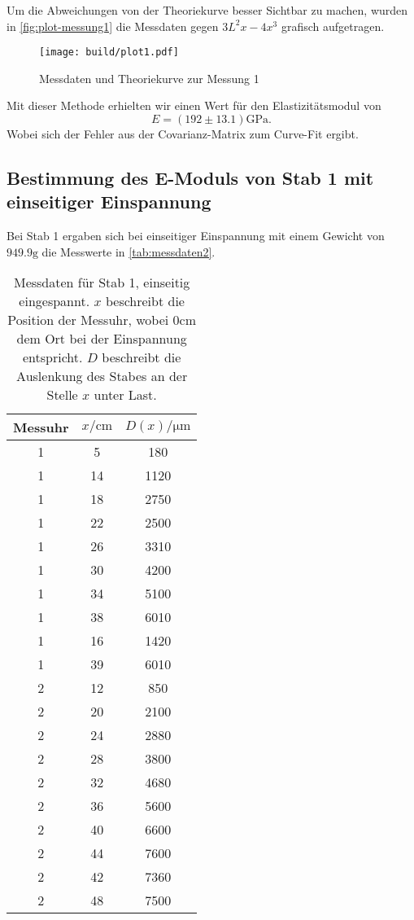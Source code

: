 Um die Abweichungen von der Theoriekurve besser Sichtbar zu machen, 
wurden in \autoref{fig:plot-messung1} die Messdaten gegen $3L^2x - 4x^3$ grafisch 
aufgetragen.
\begin{figure}[H]
	\centering
	\texttt{[image: build/plot1.pdf]}
	\caption{Messdaten und Theoriekurve zur Messung 1}
	\label{fig:plot-messung1}
\end{figure}

Mit dieser Methode erhielten wir einen Wert für den Elastizitätsmodul von
\begin{equation}
	E = (192 \pm 13.1) \si{\giga\pascal}.
	\label{eqn:E-messung1}
\end{equation}
Wobei sich der Fehler aus der Covarianz-Matrix zum Curve-Fit ergibt.

\subsection{Bestimmung des E-Moduls von Stab 1 mit einseitiger Einspannung}
\label{sec:messung2}

Bei Stab 1 ergaben sich bei einseitiger Einspannung 
mit einem Gewicht von $949.9 \si{\gram}$ 
die Messwerte in \autoref{tab:messdaten2}.

\begin{table}
	\centering
	\caption{Messdaten für Stab 1, einseitig eingespannt. $x$ beschreibt
	die Position der Messuhr, wobei $0\si{\centi\meter}$
	dem Ort bei der Einspannung entspricht.
	$D$ beschreibt die Auslenkung des Stabes an der Stelle $x$ unter Last.}
	\label{tab:messdaten2}
	\begin{tabular}{c c c}
	\toprule
	Messuhr &
	$x / \si{\centi\meter}$ &
	$D(x) / \si{\micro\meter}$
	\\
	\midrule
	1 & 5 & 180 \\
	1 & 14 & 1120 \\
	1 & 18 & 2750 \\
	1 & 22 & 2500 \\
	1 & 26 & 3310 \\
	1 & 30 & 4200 \\
	1 & 34 & 5100 \\
	1 & 38 & 6010 \\
	1 & 16 & 1420 \\
	1 & 39 & 6010 \\
	2 & 12 & 850 \\
	2 & 20 & 2100 \\
	2 & 24 & 2880 \\
	2 & 28 & 3800 \\
	2 & 32 & 4680 \\
	2 & 36 & 5600 \\
	2 & 40 & 6600 \\
	2 & 44 & 7600 \\
	2 & 42 & 7360 \\
	2 & 48 & 7500 \\
	\bottomrule
\end{tabular}
\end{table}

